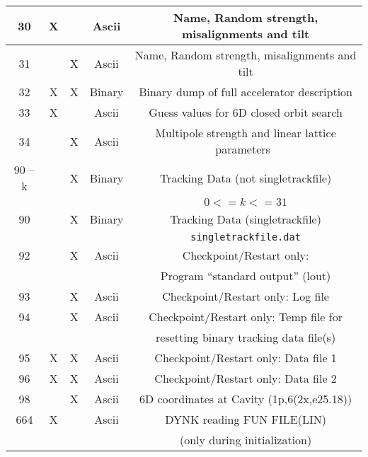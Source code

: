 \documentclass[a4paper,11pt]{report}
\begin{document}
\begin{center}
\begin{longtable}{|c|c|c|c|c|}
  \hline \rule[-3.75mm]{0mm}{10mm}
  30 & X & & Ascii & Name, Random strength, misalignments and tilt \\
  \hline \rule[-3.75mm]{0mm}{10mm}
  31 & & X & Ascii & Name, Random strength, misalignments and tilt \\
  \hline \rule[-3.75mm]{0mm}{10mm}
  32 & X & X & Binary & Binary dump of full accelerator description \\
  \hline \rule[-3.75mm]{0mm}{10mm}
  33 & X & & Ascii & Guess values for 6D closed orbit search \\
  \hline \rule[-3.75mm]{0mm}{10mm}
  34 & & X & Ascii & Multipole strength and linear lattice
    parameters~\cite{SODD} \\ 
  \hline \rule[-1.25mm]{0mm}{7.5mm}
  90 -- k & & X & Binary & Tracking Data (not singletrackfile)\\*
  \rule[-3.7mm]{0mm}{7.5mm}
  & & & & $ 0 <= k <= 31 $\\
  \hline \rule[-1.25mm]{0mm}{7.5mm}
  90 & & X & Binary & Tracking Data (singletrackfile)\\*
  \rule[-3.7mm]{0mm}{7.5mm}
  & & & & \texttt{singletrackfile.dat}\\
  \hline \rule[-3.75mm]{0mm}{10mm}
  92 & & X & Ascii & Checkpoint/Restart only: \\*
  \rule[-3.7mm]{0mm}{7.5mm}
  & & & & Program ``standard output'' (lout) \\
  \hline \rule[-3.75mm]{0mm}{10mm}
  93 & & X & Ascii & Checkpoint/Restart only: Log file \\
  \hline \rule[-3.75mm]{0mm}{10mm}
  94 & & X & Ascii & Checkpoint/Restart only: Temp file for \\* 
  \rule[-3.7mm]{0mm}{7.5mm}
  & & & &resetting binary tracking data file(s) \\
  \hline \rule[-3.75mm]{0mm}{10mm}
  95 & X & X & Ascii & Checkpoint/Restart only: Data file 1 \\
  \hline \rule[-3.75mm]{0mm}{10mm}
  96 & X & X & Ascii & Checkpoint/Restart only: Data file 2 \\
  \hline \rule[-3.75mm]{0mm}{10mm}
  98 & & X & Ascii & 6D coordinates at Cavity (1p,6(2x,e25.18)) \\
  \hline \rule[-3.75mm]{0mm}{10mm}
  664 & X &  & Ascii & DYNK reading FUN FILE(LIN) \\*
  \rule[-3.7mm]{0mm}{7.5mm}
  & & & & (only during initialization) \\

\end{longtable}
\end{center}
\end{document}
